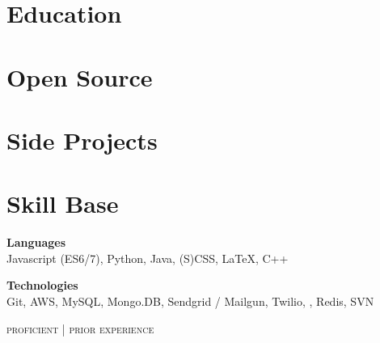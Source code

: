 \documentclass{article}
\begin{document}
\begin{minipage}[t]{0.35\textwidth}
  \vspace{0pt}

  \section{Education}

    

    

  \section{Open Source}

    

    

    

  \section{Side Projects}

  \section{Skill Base}
  {\raggedright
    \textbf{Languages} \\
    {\small
      {\color{highlight}
        Javascript (ES6/7), Python, Java, (S)CSS,
      }
      LaTeX, C++
    }

    \vspace{5pt}

    \textbf{Technologies} \\
    {\small
      {\color{highlight}
        Git, AWS, MySQL, Mongo.DB, Sendgrid / Mailgun, Twilio,
      },
      Redis, SVN
    }

    \hfill\textsc{\footnotesize{{\color{highlight} proficient} | prior experience}}
  }
\end{minipage}
\end{document}
